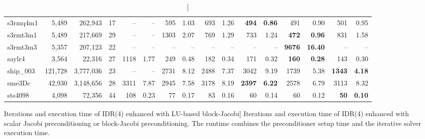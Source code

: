 \begin{landscape}
\begin{table}
\begin{tabular}{lrrr||rr|rr|rr|rr|rr|rr}
	            s3rmq4m1	&	5,489	&	262,943	&	17  &      --  &      --   &      595 &     1.03  &      693 &     1.26  & \textbf{     494} & \textbf{    0.86}  &      491 &     0.90  &      501 &     0.95\\
	            s3rmt3m1	&	5,489	&	217,669	&	29  &      --  &      --   &     1303 &     2.07  &      769 &     1.29  &      733 &     1.24  & \textbf{     472} & \textbf{    0.96}  &      831 &     1.58\\
	            s3rmt3m3	&	5,357	&	207,123	&	22  &      --  &      --   &      --  &      --   &      --  &      --   &      --  &      --   & \textbf{    9676} & \textbf{   16.40}  &      --  &      -- \\
	              saylr4	&	3,564	&	22,316	&	27  &     1118 &     1.77  &      249 &     0.48  &      182 &     0.34  &      171 &     0.32  & \textbf{     160} & \textbf{    0.28}  &      143 &     0.30\\
	            ship\_003	&	121,728	&	3,777,036	&	23  &      --  &      --   &     2731 &     8.12  &     2488 &     7.37  &     3042 &     9.19  &     1739 &     5.38  & \textbf{    1343} & \textbf{    4.18}\\
	              sme3Dc	&	42,930	&	3,148,656	&	28  &     3311 &     7.87  &     2945 &     7.58  &     3178 &     8.19  & \textbf{    2397} & \textbf{    6.22}  &     2578 &     6.79  &     3113 &     8.32\\
	             sts4098	&	4,098	&	72,356	&	44  &      108 &     0.23  &       77 &     0.17  &       83 &     0.16  &       60 &     0.14  &       60 &     0.12  & \textbf{      50} & \textbf{    0.10}\\
\hline
\hline
\end{tabular}

\captionsetup{width=\textwidth}
\caption
[Iterations and execution time of IDR(4) enhanced with LU-based block-Jacobi]
{Iterations and execution time of IDR(4) enhanced with scalar Jacobi
    preconditioning or block-Jacobi preconditioning.
The runtime combines the preconditioner setup time and the iterative solver execution time.}
\label{2017-lu-block-jacobi:tab:idr4comparison}
\end{table}
\end{landscape}
